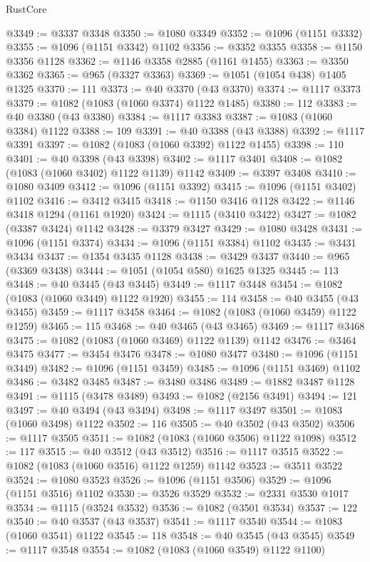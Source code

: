 \begin{lexlean}{RustCore}
\begin{coremodule}
@3349 := @3337 @3348
@3350 := @1080 @3349
@3352 := @1096 (@1151 @3332)
@3355 := @1096 (@1151 @3342) @1102
@3356 := @3352 @3355
@3358 := @1150 @3356 @1128
@3362 := @1146 @3358 @2885 (@1161 @1455)
@3363 := @3350 @3362
@3365 := @965 (@3327 @3363)
@3369 := @1051 (@1054 @438) @1405 @1325
@3370 := 111
@3373 := @40 @3370 (@43 @3370)
@3374 := @1117 @3373
@3379 := @1082 (@1083 (@1060 @3374) @1122 @1485)
@3380 := 112
@3383 := @40 @3380 (@43 @3380)
@3384 := @1117 @3383
@3387 := @1083 (@1060 @3384) @1122
@3388 := 109
@3391 := @40 @3388 (@43 @3388)
@3392 := @1117 @3391
@3397 := @1082 (@1083 (@1060 @3392) @1122 @1455)
@3398 := 110
@3401 := @40 @3398 (@43 @3398)
@3402 := @1117 @3401
@3408 := @1082 (@1083 (@1060 @3402) @1122 @1139) @1142
@3409 := @3397 @3408
@3410 := @1080 @3409
@3412 := @1096 (@1151 @3392)
@3415 := @1096 (@1151 @3402) @1102
@3416 := @3412 @3415
@3418 := @1150 @3416 @1128
@3422 := @1146 @3418 @1294 (@1161 @1920)
@3424 := @1115 (@3410 @3422)
@3427 := @1082 (@3387 @3424) @1142
@3428 := @3379 @3427
@3429 := @1080 @3428
@3431 := @1096 (@1151 @3374)
@3434 := @1096 (@1151 @3384) @1102
@3435 := @3431 @3434
@3437 := @1354 @3435 @1128
@3438 := @3429 @3437
@3440 := @965 (@3369 @3438)
@3444 := @1051 (@1054 @580) @1625 @1325
@3445 := 113
@3448 := @40 @3445 (@43 @3445)
@3449 := @1117 @3448
@3454 := @1082 (@1083 (@1060 @3449) @1122 @1920)
@3455 := 114
@3458 := @40 @3455 (@43 @3455)
@3459 := @1117 @3458
@3464 := @1082 (@1083 (@1060 @3459) @1122 @1259)
@3465 := 115
@3468 := @40 @3465 (@43 @3465)
@3469 := @1117 @3468
@3475 := @1082 (@1083 (@1060 @3469) @1122 @1139) @1142
@3476 := @3464 @3475
@3477 := @3454 @3476
@3478 := @1080 @3477
@3480 := @1096 (@1151 @3449)
@3482 := @1096 (@1151 @3459)
@3485 := @1096 (@1151 @3469) @1102
@3486 := @3482 @3485
@3487 := @3480 @3486
@3489 := @1882 @3487 @1128
@3491 := @1115 (@3478 @3489)
@3493 := @1082 (@2156 @3491)
@3494 := 121
@3497 := @40 @3494 (@43 @3494)
@3498 := @1117 @3497
@3501 := @1083 (@1060 @3498) @1122
@3502 := 116
@3505 := @40 @3502 (@43 @3502)
@3506 := @1117 @3505
@3511 := @1082 (@1083 (@1060 @3506) @1122 @1098)
@3512 := 117
@3515 := @40 @3512 (@43 @3512)
@3516 := @1117 @3515
@3522 := @1082 (@1083 (@1060 @3516) @1122 @1259) @1142
@3523 := @3511 @3522
@3524 := @1080 @3523
@3526 := @1096 (@1151 @3506)
@3529 := @1096 (@1151 @3516) @1102
@3530 := @3526 @3529
@3532 := @2331 @3530 @1017
@3534 := @1115 (@3524 @3532)
@3536 := @1082 (@3501 @3534)
@3537 := 122
@3540 := @40 @3537 (@43 @3537)
@3541 := @1117 @3540
@3544 := @1083 (@1060 @3541) @1122
@3545 := 118
@3548 := @40 @3545 (@43 @3545)
@3549 := @1117 @3548
@3554 := @1082 (@1083 (@1060 @3549) @1122 @1100)

\end{coremodule}
\end{lexlean}
